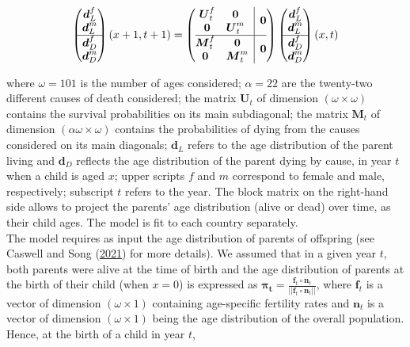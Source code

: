 \documentclass[
  11pt,
  letterpaper,
]{article}
\begin{document}
\[\begin{pmatrix} \boldsymbol{d}^f_L \\ 
\boldsymbol{d}^m_L \\ 
\hline \boldsymbol{d}^f_D \\ 
\boldsymbol{d}^m_D 
\end{pmatrix}(x+1, t+1) = 
\left(\begin{array}{@{}c|c@{}}
  \begin{matrix} 
  \boldsymbol{U}^f_t & \boldsymbol{0} \\ 
  \boldsymbol{0} & \boldsymbol{U}^m_t 
  \end{matrix} & \boldsymbol{0} \\
\hline
\begin{matrix} 
  \boldsymbol{M}^f_t & \boldsymbol{0} \\ 
  \boldsymbol{0} & \boldsymbol{M}^m_t 
  \end{matrix} & \boldsymbol{0} \\
\end{array}\right)
\begin{pmatrix} \boldsymbol{d}^f_L \\ 
\boldsymbol{d}^m_L \\ 
\hline \boldsymbol{d}^f_D \\ 
\boldsymbol{d}^m_D
\end{pmatrix}(x, t)\]

where \(\omega=101\) is the number of ages considered; \(\alpha=22\) are the twenty-two different causes of death considered; the matrix \(\boldsymbol{U}_t\) of dimension \((\omega \times \omega)\) contains the survival probabilities on its main subdiagonal; the matrix \(\boldsymbol{M}_t\) of dimension \((\alpha\omega \times \omega)\) contains the probabilities of dying from the causes considered on its main diagonals; \(\boldsymbol{d}_L\) refers to the age distribution of the parent living and \(\boldsymbol{d}_D\) reflects the age distribution of the parent dying by cause, in year \(t\) when a child is aged \(x\); upper scripts \(f\) and \(m\) correspond to female and male, respectively; subscript \(t\) refers to the year. The block matrix on the right-hand side allows to project the parents' age distribution (alive or dead) over time, as their child ages. The model is fit to each country separately.\\
The model requires as input the age distribution of parents of offspring (see Caswell and Song (\protect\hyperlink{ref-caswell2021formal}{2021}) for more details). We assumed that in a given year \(t\), both parents were alive at the time of birth and the age distribution of parents at the birth of their child (when \(x=0\)) is expressed as \(\boldsymbol{\pi_t} = \frac{\boldsymbol{f}_t \circ \boldsymbol{n}_t}{||\boldsymbol{f}_t \circ \boldsymbol{n}_t||}\), where \(\boldsymbol{f}_t\) is a vector of dimension \((\omega \times 1)\) containing age-specific fertility rates and \(\boldsymbol{n}_t\) is a vector of dimension \((\omega \times 1)\) being the age distribution of the overall population. Hence, at the birth of a child in year \(t\),
\end{document}
